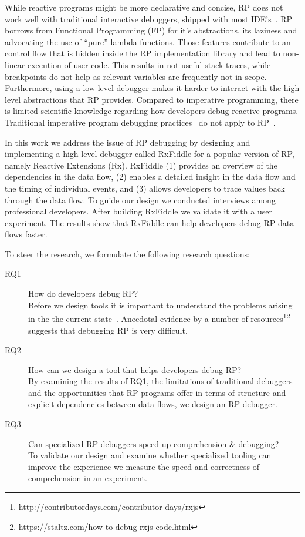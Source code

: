 While reactive programs might be more declarative and concise, RP does not work well with traditional interactive debuggers, shipped with most IDE's~\cite{salvaneschi2016debugging}. RP borrows from Functional Programming (FP) for it's abstractions, its laziness and advocating the use of ``pure'' lambda functions. Those features contribute to an control flow that is hidden inside the RP implementation library and lead to non-linear execution of user code. This results in not useful stack traces, while breakpoints do not help as relevant variables are frequently not in scope. Furthermore, using a low level debugger makes it harder to interact with the high level abstractions that RP provides.
Compared to imperative programming, there is limited scientific knowledge regarding how developers debug reactive programs. Traditional imperative program debugging practices~\cite{beller2017behavior} do not apply to RP~\cite{salvaneschi2016debugging}.

In this work we address the issue of RP debugging by designing and implementing a high level debugger called RxFiddle for a popular version of RP, namely Reactive Extensions (Rx). RxFiddle  (1) provides an overview of the dependencies in the data flow, (2) enables a detailed insight in the data flow and the timing of individual events, and (3) allows developers to trace values back through the data flow. To guide our design we conducted interviews among professional developers. After building RxFiddle we validate it with a user experiment. The results show that RxFiddle can help developers debug RP data flows faster.

To steer the research, we formulate the following research questions:

\begin{description}
\item[RQ1] How do developers debug RP? \\
Before we design tools it is important to understand the problems arising in the the current state~\cite{singer2010examination}. Anecdotal evidence by a number of resources\footnote{\label{foot:contribdays}http://contributordays.com/contributor-days/rxjs}\footnote{https://staltz.com/how-to-debug-rxjs-code.html}
suggests that debugging RP is very difficult.

\item[RQ2] How can we design a tool that helps developers debug RP? \\
By examining the results of RQ1, the limitations of traditional debuggers and the opportunities that RP programs offer in terms of structure and explicit dependencies between data flows, we design an RP debugger.

\item[RQ3] Can specialized RP debuggers speed up comprehension \& debugging? \\
To validate our design and examine whether specialized tooling can improve the experience we measure the speed and correctness of comprehension in an experiment.

\end{description}
